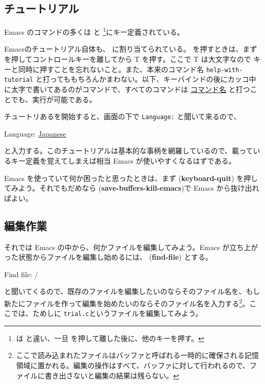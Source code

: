 \subsection{チュートリアル}
Emacs のコマンドの多くは
 と \footnote{ は  と違い、一旦  を押して離した後に、他のキーを押す。}にキー定義されている。

Emacsのチュートリアル自体も、
  に割り当てられている。  を押すときは、まずを押してコントロールキーを離してから T を押す。ここで T は大文字なので  キーと同時に押すことを忘れないこと。また、本来のコマンド名  {\tt help-with-tutorial} と打ってももちろんかまわない。以下、キーバインドの後にカッコ中に太字で書いてあるのがコマンドで、すべてのコマンドは  \underline{コマンド名} と打つことでも、実行が可能である。

チュートリあるを開始すると、画面の下で {\tt Language:} と聞いて来るので、
\begin{commandline2}
Language: \underline{Japanese}
\end{commandline2} \noindent
と入力する。このチュートリアルは基本的な事柄を網羅しているので、載っているキー定義を覚えてしまえば相当 Emacs が使いやすくなるはずである。

Emacs を使っていて何か困ったと思ったときは、まず  ({\bf keyboard-quit})
を押してみよう。それでもだめなら   ({\bf save-buffers-kill-emacs})で Emacs から抜け出ればよい。

\subsection{編集作業}
それでは Emacs の中から、何かファイルを編集してみよう。Emacs が立ち上がった状態からファイルを編集し始めるには、  ({\bf find-file})
とする。
\begin{commandline2}
Find file: \til /
\end{commandline2} \noindent
と聞いてくるので、既存のファイルを編集したいのならそのファイル名を、もし新たにファイルを作って編集を始めたいのならそのファイル名を入力する\footnote{ここで読み込まれたファイルはバッファと呼ばれる一時的に確保される記憶領域に置かれる。編集の操作はすべて、バッファに対して行われるので、ファイルに書き出さないと編集の結果は残らない。}。ここでは、ためしに {\tt trial.c}というファイルを編集してみよう。

